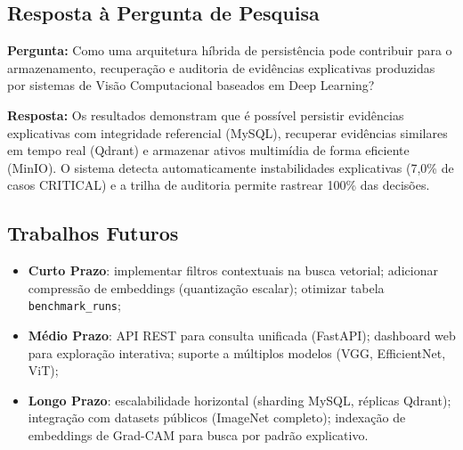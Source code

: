 \documentclass[12pt,a4paper,twoside]{article}
\begin{document}
\subsection{Resposta à Pergunta de Pesquisa}

\textbf{Pergunta:} Como uma arquitetura híbrida de persistência pode contribuir para o armazenamento, recuperação e auditoria de evidências explicativas produzidas por sistemas de Visão Computacional baseados em Deep Learning?

\textbf{Resposta:} Os resultados demonstram que é possível persistir evidências explicativas com integridade referencial (MySQL), recuperar evidências similares em tempo real (Qdrant) e armazenar ativos multimídia de forma eficiente (MinIO). O sistema detecta automaticamente instabilidades explicativas (7,0\% de casos CRITICAL) e a trilha de auditoria permite rastrear 100\% das decisões.

\subsection{Trabalhos Futuros}

\begin{itemize}
    \item \textbf{Curto Prazo}: implementar filtros contextuais na busca vetorial; adicionar compressão de embeddings (quantização escalar); otimizar tabela \texttt{benchmark\_runs};
    \item \textbf{Médio Prazo}: API REST para consulta unificada (FastAPI); dashboard web para exploração interativa; suporte a múltiplos modelos (VGG, EfficientNet, ViT);
    \item \textbf{Longo Prazo}: escalabilidade horizontal (sharding MySQL, réplicas Qdrant); integração com datasets públicos (ImageNet completo); indexação de embeddings de Grad-CAM para busca por padrão explicativo.
\end{itemize}



\end{document}
